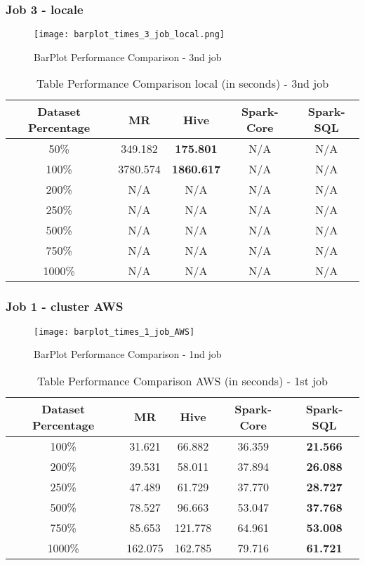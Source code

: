 \subsubsection{Job 3 - locale}
\begin{figure}[!ht]
    \centering
    \texttt{[image: barplot\_times\_3\_job\_local.png]}
    \caption{BarPlot Performance Comparison - 3nd job}
\end{figure}

\begin{table}[!ht]
  \centering
  \caption{Table Performance Comparison local (in seconds) - 3nd job}
  \label{tab:performance}
  \begin{tabular}{c|c|c|c|c}
    \toprule
    Dataset Percentage & MR & Hive & Spark-Core & Spark-SQL \\
    \midrule
    50\% & 349.182 & \textbf{175.801} & N/A & N/A \\
    100\% & 3780.574 & \textbf{1860.617} & N/A & N/A \\
    200\% & N/A & N/A & N/A & N/A \\
    250\% & N/A & N/A & N/A & N/A \\
    500\% & N/A & N/A & N/A & N/A \\
    750\% & N/A & N/A & N/A & N/A \\
    1000\% & N/A & N/A & N/A & N/A \\
    \bottomrule
  \end{tabular}
\end{table}
\newpage


\subsubsection{Job 1 - cluster AWS}

\begin{figure}[!ht]
    \centering
    \texttt{[image: barplot\_times\_1\_job\_AWS]}
    \caption{BarPlot Performance Comparison - 1nd job}
\end{figure}

\begin{table}[!ht]
  \centering
  \caption{Table Performance Comparison AWS (in seconds) - 1st job}
  \label{tab:performance}
  \begin{tabular}{c|c|c|c|c}
    \toprule
    Dataset Percentage & MR & Hive & Spark-Core & Spark-SQL \\
    \midrule
     100\% & 31.621 & 66.882 & 36.359 & \textbf{21.566} \\
    200\% & 39.531 & 58.011 & 37.894 & \textbf{26.088} \\
    250\% & 47.489 & 61.729 & 37.770 & \textbf{28.727} \\
    500\% & 78.527 & 96.663 & 53.047 & \textbf{37.768} \\
    750\% & 85.653 & 121.778 & 64.961 & \textbf{53.008} \\
    1000\% & 162.075 & 162.785 & 79.716 & \textbf{61.721} \\
    \bottomrule
  \end{tabular}
\end{table}
\newpage


